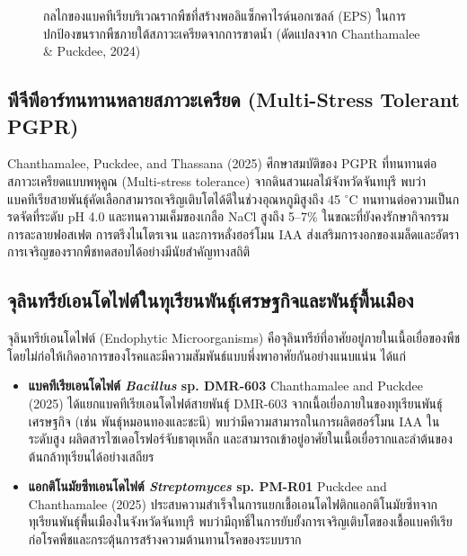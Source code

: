 \begin{figure}[H]
\caption{กลไกของแบคทีเรียบริเวณรากพืชที่สร้างพอลิแซ็กคาไรด์นอกเซลล์ (EPS) ในการปกป้องขนรากพืชภายใต้สภาวะเครียดจากการขาดน้ำ (ดัดแปลงจาก Chanthamalee \& Puckdee, 2024)}
\label{fig:eps_drought_mechanism}
\end{figure}

\subsection{พีจีพีอาร์ทนทานหลายสภาวะเครียด (Multi-Stress Tolerant PGPR)}
Chanthamalee, Puckdee, and Thassana (2025) ศึกษาสมบัติของ PGPR ที่ทนทานต่อสภาวะเครียดแบบพหุคูณ (Multi-stress tolerance) จากดินสวนผลไม้จังหวัดจันทบุรี พบว่าแบคทีเรียสายพันธุ์คัดเลือกสามารถเจริญเติบโตได้ดีในช่วงอุณหภูมิสูงถึง 45 $^{\circ}\text{C}$ ทนทานต่อความเป็นกรดจัดที่ระดับ pH 4.0 และทนความเค็มของเกลือ NaCl สูงถึง 5--7\% ในขณะที่ยังคงรักษากิจกรรมการละลายฟอสเฟต การตรึงไนโตรเจน และการหลั่งฮอร์โมน IAA ส่งเสริมการงอกของเมล็ดและอัตราการเจริญของรากพืชทดสอบได้อย่างมีนัยสำคัญทางสถิติ

\subsection{จุลินทรีย์เอนโดไฟต์ในทุเรียนพันธุ์เศรษฐกิจและพันธุ์พื้นเมือง}
จุลินทรีย์เอนโดไฟต์ (Endophytic Microorganisms) คือจุลินทรีย์ที่อาศัยอยู่ภายในเนื้อเยื่อของพืชโดยไม่ก่อให้เกิดอาการของโรคและมีความสัมพันธ์แบบพึ่งพาอาศัยกันอย่างแนบแน่น ได้แก่
\begin{itemize}
    \item \textbf{แบคทีเรียเอนโดไฟต์ \textit{Bacillus} sp. DMR-603} Chanthamalee and Puckdee (2025) ได้แยกแบคทีเรียเอนโดไฟต์สายพันธุ์ DMR-603 จากเนื้อเยื่อภายในของทุเรียนพันธุ์เศรษฐกิจ (เช่น พันธุ์หมอนทองและชะนี) พบว่ามีความสามารถในการผลิตฮอร์โมน IAA ในระดับสูง ผลิตสารไซเดอโรฟอร์จับธาตุเหล็ก และสามารถเข้าอยู่อาศัยในเนื้อเยื่อรากและลำต้นของต้นกล้าทุเรียนได้อย่างเสถียร
    \item \textbf{แอกติโนมัยซีทเอนโดไฟต์ \textit{Streptomyces} sp. PM-R01} Puckdee and Chanthamalee (2025) ประสบความสำเร็จในการแยกเชื้อเอนโดไฟติกแอกติโนมัยซีทจากทุเรียนพันธุ์พื้นเมืองในจังหวัดจันทบุรี พบว่ามีฤทธิ์ในการยับยั้งการเจริญเติบโตของเชื้อแบคทีเรียก่อโรคพืชและกระตุ้นการสร้างความต้านทานโรคของระบบราก
\end{itemize}

